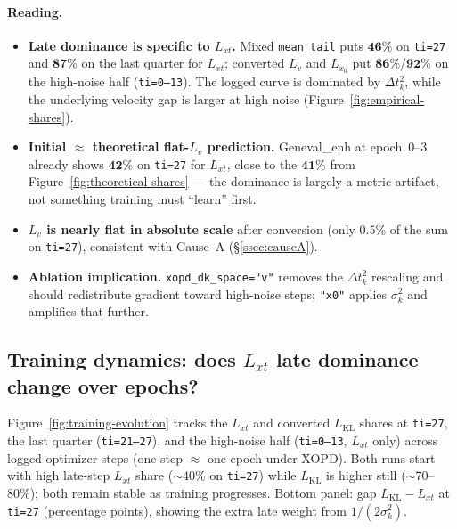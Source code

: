\documentclass[11pt,a4paper]{article}
\newcommand{\dt}{\Delta t}
\begin{document}
\paragraph{Reading.}
\begin{itemize}[leftmargin=1.5em]
\item \textbf{Late dominance is specific to $L_{xt}$.} Mixed \texttt{mean\_tail} puts
$\mathbf{46\%}$ on \texttt{ti=27} and $\mathbf{87\%}$ on the last quarter for $L_{xt}$; converted
$L_v$ and $L_{x_0}$ put $\mathbf{86\%}$/$\mathbf{92\%}$ on the high-noise half
(\texttt{ti=0--13}). The logged curve is dominated by $\dt_k^2$, while the underlying velocity gap
is larger at high noise (Figure~\ref{fig:empirical-shares}).
\item \textbf{Initial $\approx$ theoretical flat-$L_v$ prediction.} Geneval\_enh at epoch~0--3 already
shows $\mathbf{42\%}$ on \texttt{ti=27} for $L_{xt}$, close to the $\mathbf{41\%}$ from
Figure~\ref{fig:theoretical-shares} --- the dominance is largely a metric artifact, not something
training must ``learn'' first.
\item \textbf{$L_v$ is nearly flat in absolute scale} after conversion (only $\mathbf{0.5\%}$ of the
sum on \texttt{ti=27}), consistent with Cause~A (\S\ref{ssec:causeA}).
\item \textbf{Ablation implication.} \texttt{xopd\_dk\_space="v"} removes the $\dt_k^2$ rescaling
and should redistribute gradient toward high-noise steps; \texttt{"x0"} applies $\sigma_k^2$ and
amplifies that further.
\end{itemize}

\subsection[Training dynamics of late dominance]
{Training dynamics: does $L_{xt}$ late dominance change over epochs?}
\label{sec:training-dynamics}

Figure~\ref{fig:training-evolution} tracks the $L_{xt}$ and converted $L_{\mathrm{KL}}$ shares at
\texttt{ti=27}, the last quarter (\texttt{ti=21--27}), and the high-noise half (\texttt{ti=0--13},
$L_{xt}$ only) across logged optimizer steps (one step $\approx$ one epoch under XOPD). Both runs
start with high late-step $L_{xt}$ share ($\sim$40\% on \texttt{ti=27}) while $L_{\mathrm{KL}}$
is higher still ($\sim$70--80\%); both remain stable as training progresses. Bottom panel: gap
$L_{\mathrm{KL}}-L_{xt}$ at \texttt{ti=27} (percentage points), showing the extra late weight from
$1/(2\sigma_k^2)$.
\end{document}
